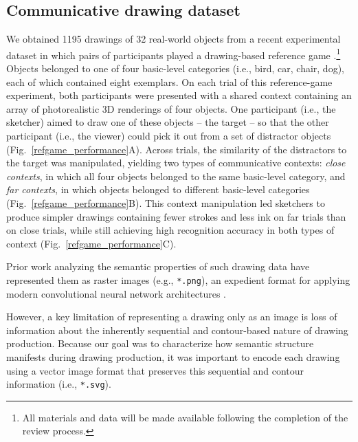 \documentclass[10pt,letterpaper]{article}
\begin{document}
\subsection{Communicative drawing dataset}
We obtained 1195 drawings of 32 real-world objects from a recent experimental dataset in which pairs of participants played a drawing-based reference game \cite{fan2018modeling}.\footnote{All materials and data will be made available following the completion of the review process.}
Objects belonged to one of four basic-level categories (i.e., bird, car, chair, dog), each of which contained eight exemplars. %
On each trial of this reference-game experiment, both participants were presented with a shared context containing an array of photorealistic 3D renderings of four objects.   
One participant (i.e., the sketcher) aimed to draw one of these objects -- the target -- so that the other participant (i.e., the viewer) could pick it out from a set of distractor objects (Fig.~\ref{refgame_performance}A). 
Across trials, the similarity of the distractors to the target was manipulated, yielding two types of communicative contexts: \textit{close contexts}, in which all four objects belonged to the same basic-level category, and \textit{far contexts}, in which objects belonged to different basic-level categories (Fig.~\ref{refgame_performance}B). 
This context manipulation led sketchers to produce simpler drawings containing fewer strokes and less ink on far trials than on close trials, while still achieving high recognition accuracy in both types of context (Fig.~\ref{refgame_performance}C). %
 


Prior work analyzing the semantic properties of such drawing data have represented them as raster images (e.g., \texttt{*.png}), an expedient format for applying modern convolutional neural network architectures \cite{FanCommon2018,sangkloy2016sketchy,yu2017sketch}. 

However, a key limitation of representing a drawing only as an image is loss of information about the inherently sequential and contour-based nature of drawing production. 
Because our goal was to characterize how semantic structure manifests during drawing production, it was important to encode each drawing using a vector image format that preserves this sequential and contour information (i.e., \texttt{*.svg}). 
\end{document}
